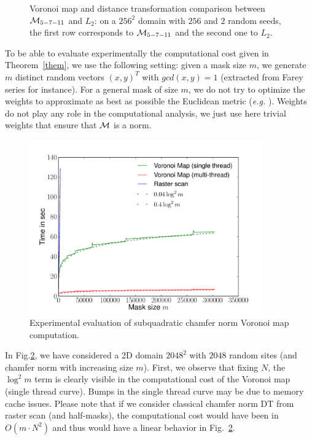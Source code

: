 \documentclass{llncs}
\begin{document}
\begin{figure}
\begin{center}
  \end{center}
  \caption{Voronoi map and distance transformation comparison between
    $\mathcal{M}_{5-7-11}$ and $L_2$: on a $256^2$ domain with $256$ and $2$
    random seeds, the first row corresponds to $\mathcal{M}_{5-7-11}$ and the second
    one to $L_2$.}
  \label{fig:2Dvoro}
\end{figure}


To be able to evaluate experimentally the
computational cost given in Theorem~\ref{them}, we use the following
setting: given a mask size $m$, we generate $m$ distinct random
vectors $(x,y)^T$ with $gcd(x,y)=1$ (extracted from Farey series for
instance). For a general mask of size $m$, we do not try to optimize
the weights to approximate as best as possible the Euclidean metric
(\emph{e.g.}  \cite{borgefors}). Weights do not play any role in the
computational analysis, we just use here trivial weights that ensure
that $\mathcal{M}$ is a norm.
\begin{figure}[htbp]
  \begin{center}
    \includegraphics[width=10cm]{data/result}
  \end{center}
  \caption{Experimental evaluation of subquadratic chamfer norm
    Voronoi map computation.}
  \label{fig:graph}
\end{figure}
In Fig.\ref{fig:graph}, we have considered a 2D domain $2048^2$ with
$2048$ random sites (and chamfer norm with increasing size
$m$). First, we observe that fixing $N$, the $\log^2{m}$ term is
clearly visible in the computational cost of the Voronoi map (single
thread curve). Bumps in the single thread curve may be due to memory
cache issues. Please note that if we consider classical chamfer norm
DT from raster scan (and half-masks), the computational cost would
have been in $O(m\cdot N^2)$ and thus would have a linear behavior in
Fig.~\ref{fig:graph}.
\end{document}
